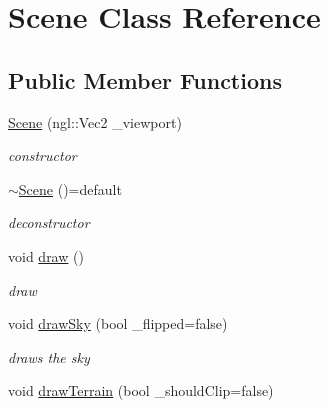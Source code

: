 \hypertarget{class_scene}{}\section{Scene Class Reference}
\label{class_scene}
\subsection*{Public Member Functions}
\begin{DoxyCompactItemize}
\item 
\hyperlink{class_scene_aa8f0812a5e5695b1ee9a9e86ed7c0308}{Scene} (ngl\+::\+Vec2 \+\_\+viewport)
\begin{DoxyCompactList}\small\item\em constructor \end{DoxyCompactList}\item 
\hypertarget{class_scene_a631eef7493cafce5d74739a2cad12a58}{}\hyperlink{class_scene_a631eef7493cafce5d74739a2cad12a58}{$\sim$\+Scene} ()=default\label{class_scene_a631eef7493cafce5d74739a2cad12a58}

\begin{DoxyCompactList}\small\item\em deconstructor \end{DoxyCompactList}\item 
\hypertarget{class_scene_ac0e3d2c98ba6063a086467fb2c19142f}{}void \hyperlink{class_scene_ac0e3d2c98ba6063a086467fb2c19142f}{draw} ()\label{class_scene_ac0e3d2c98ba6063a086467fb2c19142f}

\begin{DoxyCompactList}\small\item\em draw \end{DoxyCompactList}\item 
\hypertarget{class_scene_ae3c83b1fcccc713f629dbc2f26d62e05}{}void \hyperlink{class_scene_ae3c83b1fcccc713f629dbc2f26d62e05}{draw\+Sky} (bool \+\_\+flipped=false)\label{class_scene_ae3c83b1fcccc713f629dbc2f26d62e05}

\begin{DoxyCompactList}\small\item\em draws the sky \end{DoxyCompactList}\item 
\hypertarget{class_scene_a88618a97b26bef8af37f573821c91300}{}void \hyperlink{class_scene_a88618a97b26bef8af37f573821c91300}{draw\+Terrain} (bool \+\_\+should\+Clip=false)\label{class_scene_a88618a97b26bef8af37f573821c91300}


\end{DoxyCompactItemize}
